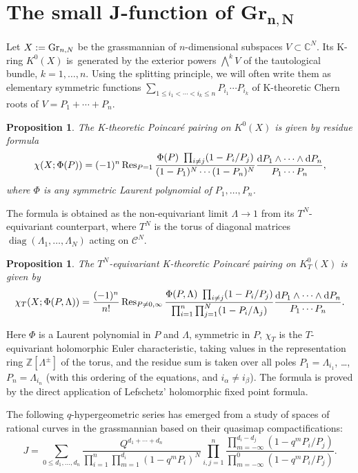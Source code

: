 \documentclass[pdftex]{sigma}
\numberwithin{equation}{section}
\newtheorem{Proposition}[Theorem]{Proposition}
{ \theoremstyle{definition}
\newtheorem{Definition}[Theorem]{Definition}
\newtheorem{Example}[Theorem]{Example}
\newtheorem{Remark}[Theorem]{Remark} }
\def\C{\mathcal C}
\def\ZZ{\mathbb Z}
\def\CC{\mathbb C}
\def\Res{\operatorname{Res}}
\def\a{\alpha}
\def\b{\beta}
\begin{document}
\section[The small J-function of Gr {n,N}]{The small J-function of $\mathbf{Gr}_{\boldsymbol{n,N}}$}
\label{Sec2}

{\sloppy
Let $X:={\rm Gr}_{n,N}$ be the grassmannian of $n$-dimensional subspaces $V\subset \CC^N$. Its K-ring $K^0(X)$ is~generated by the exterior powers $\bigwedge^kV$ of the tautological bundle, $k=1,\dots,n$. Using the \mbox{splitting} principle, we will often write them as elementary symmetric functions $\sum_{1\leq i_1<\cdots<i_k\leq n}P_{i_1}\cdots P_{i_k}$ of K-theoretic Chern roots of $V=P_1+\cdots+P_n$.

}

\begin{Proposition} \label{prop1}
The K-theoretic Poincar{\'e} pairing on $K^0(X)$ is given by residue formula
\[
\chi(X; \Phi(P))= (-1)^n\Res_{P=1} \frac{\Phi(P) \ \prod_{i\neq j}(1-P_i/P_j)}{(1-P_1)^N\cdots(1-P_n)^N} \frac{{\rm d}P_1\wedge\cdots \wedge {\rm d}P_n}{P_1\cdots P_n},
\]
where $\Phi$ is any symmetric Laurent polynomial of $P_1,\dots,P_n$.
\end{Proposition}

The formula is obtained as the non-equivariant limit $\Lambda\to 1$ from its $T^N$-equivariant counterpart, where $T^N$ is the torus of diagonal matrices $\operatorname{diag}(\Lambda_1,\dots,\Lambda_N)$ acting on $\C^N$.

\begin{Proposition}\label{prop2}
The $T^N$-equivariant K-theoretic Poincar{\'e} pairing on $K^0_T(X)$ is given by
\[
\chi_T(X;\Phi(P,\Lambda))= \frac{(-1)^n}{n!} \Res_{P\neq 0,\infty} \frac{\Phi(P,\Lambda)\ \prod_{i\neq j}(1-P_i/P_j)}{\prod_{i=1}^n\prod_{j=1}^N(1-P_i/\Lambda_j)} \frac{{\rm d}P_1\wedge\cdots \wedge {\rm d}P_n}{P_1\cdots P_n}.
\]
\end{Proposition}
Here $\Phi$ is a Laurent polynomial in $P$ and $\Lambda$, symmetric in $P$, $\chi_T$ is the $T$-equivariant holomorphic Euler characteristic, taking values in the representation ring $\ZZ[\Lambda^{\pm}]$ of the torus, and the residue sum is taken over all poles $P_1=\Lambda_{i_1}$, \dots, $P_n=\Lambda_{i_n}$ (with this ordering of the equations, and $i_\a\neq i_\b$). The formula is proved by the direct application of Lefschetz' holomorphic fixed point formula.

The following $q$-hypergeometric series has emerged from a study of spaces of rational curves in the grassmannian based on their quasimap compactifications:
\[
J=\sum_{0\leq d_1,\dots,d_n}\frac{Q^{d_1+\cdots+ d_n}}{\prod_{i=1}^n\prod_{m=1}^{d_i}(1-q^mP_i)^N} \prod_{i,j=1}^n\frac{\prod_{m=-\infty}^{d_i-d_j}(1-q^mP_i/P_j)} {\prod_{m=-\infty}^0(1-q^mP_i/P_j)}.
\]
\end{document}
